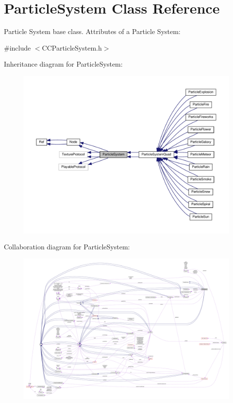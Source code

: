 \hypertarget{classParticleSystem}{}\section{Particle\+System Class Reference}
\label{classParticleSystem}


Particle System base class. Attributes of a Particle System\+:  




{\ttfamily \#include $<$C\+C\+Particle\+System.\+h$>$}



Inheritance diagram for Particle\+System\+:
\nopagebreak
\begin{figure}[H]
\begin{center}
\leavevmode
\includegraphics[width=350pt]{classParticleSystem__inherit__graph}
\end{center}
\end{figure}


Collaboration diagram for Particle\+System\+:
\nopagebreak
\begin{figure}[H]
\begin{center}
\leavevmode
\includegraphics[width=350pt]{classParticleSystem__coll__graph}
\end{center}
\end{figure}
